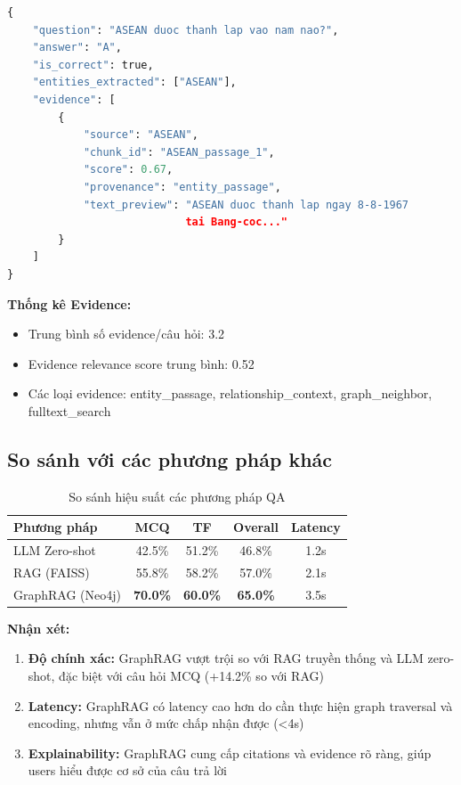 \begin{lstlisting}[language=Python, caption={Ví dụ output với citations}]
{
    "question": "ASEAN duoc thanh lap vao nam nao?",
    "answer": "A",
    "is_correct": true,
    "entities_extracted": ["ASEAN"],
    "evidence": [
        {
            "source": "ASEAN",
            "chunk_id": "ASEAN_passage_1",
            "score": 0.67,
            "provenance": "entity_passage",
            "text_preview": "ASEAN duoc thanh lap ngay 8-8-1967 
                            tai Bang-coc..."
        }
    ]
}
\end{lstlisting}

\textbf{Thống kê Evidence:}
\begin{itemize}
    \item Trung bình số evidence/câu hỏi: 3.2
    \item Evidence relevance score trung bình: 0.52
    \item Các loại evidence: entity\_passage, relationship\_context, graph\_neighbor, fulltext\_search
\end{itemize}

\subsection{So sánh với các phương pháp khác}

\begin{table}[H]
\centering
\caption{So sánh hiệu suất các phương pháp QA}
\label{tab:method-comparison}
\begin{tabular}{|l|c|c|c|c|}
\hline
\textbf{Phương pháp} & \textbf{MCQ} & \textbf{TF} & \textbf{Overall} & \textbf{Latency} \\
\hline
LLM Zero-shot & 42.5\% & 51.2\% & 46.8\% & 1.2s \\
RAG (FAISS) & 55.8\% & 58.2\% & 57.0\% & 2.1s \\
GraphRAG (Neo4j) & \textbf{70.0\%} & \textbf{60.0\%} & \textbf{65.0\%} & 3.5s \\
\hline
\end{tabular}
\end{table}

\textbf{Nhận xét:}
\begin{enumerate}
    \item \textbf{Độ chính xác:} GraphRAG vượt trội so với RAG truyền thống và LLM zero-shot, đặc biệt với câu hỏi MCQ (+14.2\% so với RAG)
    
    \item \textbf{Latency:} GraphRAG có latency cao hơn do cần thực hiện graph traversal và encoding, nhưng vẫn ở mức chấp nhận được (<4s)
    
    \item \textbf{Explainability:} GraphRAG cung cấp citations và evidence rõ ràng, giúp users hiểu được cơ sở của câu trả lời
\end{enumerate}

